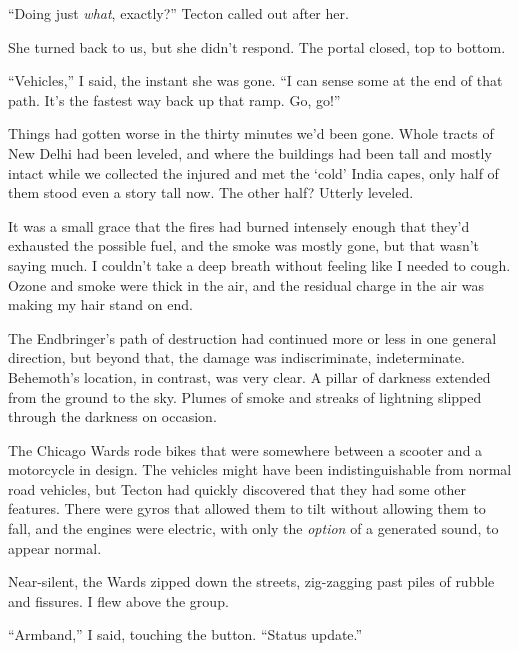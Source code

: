 ``Doing just \emph{what}, exactly?''  Tecton called out after her.



She turned back to us, but she didn't respond.  The portal closed, top to bottom.



``Vehicles,'' I said, the instant she was gone.  ``I can sense some at the end of that path.  It's the fastest way back up that ramp.  Go, go!''



\blacksquare



Things had gotten worse in the thirty minutes we'd been gone.  Whole tracts of New Delhi had been leveled, and where the buildings had been tall and mostly intact while we collected the injured and met the `cold' India capes, only half of them stood even a story tall now.  The other half?  Utterly leveled.



It was a small grace that the fires had burned intensely enough that they'd exhausted the possible fuel, and the smoke was mostly gone, but that wasn't saying much.  I couldn't take a deep breath without feeling like I needed to cough.  Ozone and smoke were thick in the air, and the residual charge in the air was making my hair stand on end.



The Endbringer's path of destruction had continued more or less in one general direction, but beyond that, the damage was indiscriminate, indeterminate.  Behemoth's location, in contrast, was very clear.  A pillar of darkness extended from the ground to the sky.  Plumes of smoke and streaks of lightning slipped through the darkness on occasion.



The Chicago Wards rode bikes that were somewhere between a scooter and a motorcycle in design.  The vehicles might have been indistinguishable from normal road vehicles, but Tecton had quickly discovered that they had some other features.  There were gyros that allowed them to tilt without allowing them to fall, and the engines were electric, with only the \emph{option} of a generated sound, to appear normal.



Near-silent, the Wards zipped down the streets, zig-zagging past piles of rubble and fissures.   I flew above the group.



``Armband,'' I said, touching the button.  ``Status update.''



